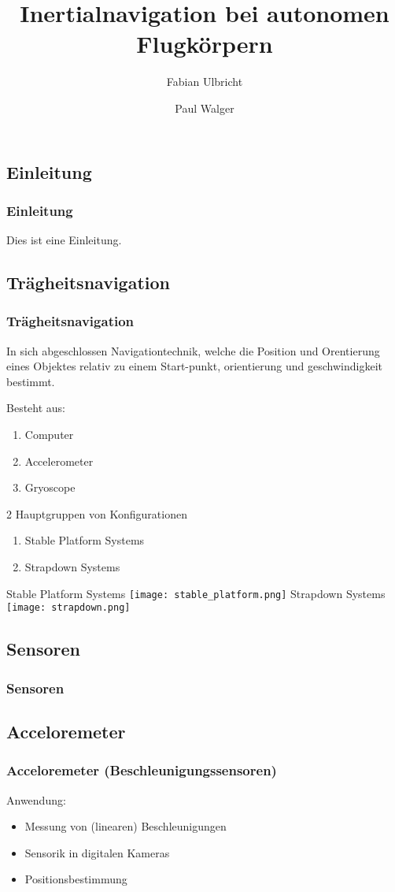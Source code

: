 \documentclass[10pt,a4paper,oneside]{beamer}
\title{Inertialnavigation bei autonomen Flugkörpern}
\author{
	Fabian Ulbricht \and
	Paul Walger 
}
\begin{document}
\frame{
	\titlepage
}


\begin{frame}
  \section{Einleitung}
  \frametitle{Einleitung}
  
  Dies ist eine Einleitung.
\end{frame}


\begin{frame}
	\section{Trägheitsnavigation}
	\frametitle{Trägheitsnavigation}
	In sich abgeschlossen Navigationtechnik, welche die Position und Orentierung eines Objektes relativ zu einem Start-punkt, orientierung und geschwindigkeit bestimmt.
	
	Besteht aus:
	\begin{enumerate}
		\item Computer
		\item Accelerometer
		\item Gryoscope
	\end{enumerate}
	
	2 Hauptgruppen von Konfigurationen \cite{Wood07}
	\begin{enumerate}
		\item Stable Platform Systems
		\item Strapdown Systems
	\end{enumerate}
\end{frame}
\begin{frame}
	Stable Platform Systems
	\resizebox{\textwidth}{0.4\textheight} {
	\texttt{[image: stable\_platform.png]} 
	}
	\bigskip
	Strapdown Systems
	\resizebox{\textwidth}{0.4\textheight} {
		\texttt{[image: strapdown.png]} 
	}

\end{frame}
\begin{frame}
  \section{Sensoren}
  \frametitle{Sensoren}
\end{frame}

\begin{frame}
  \subsection{Acceloremeter}
  \frametitle{Acceloremeter (Beschleunigungssensoren)}
  
  Anwendung:
  \begin{itemize}
    \item Messung von (linearen) Beschleunigungen
  	\item Sensorik in digitalen Kameras
  	\item Positionsbestimmung
  \end{itemize}
\end{frame}
\end{document}
